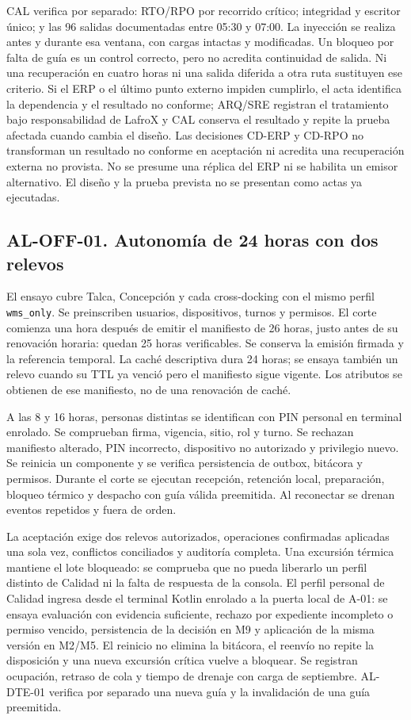 CAL verifica por separado: RTO/RPO por recorrido crítico; integridad y escritor único; y las 96 salidas documentadas entre 05:30 y 07:00. La inyección se realiza antes y durante esa ventana, con cargas intactas y modificadas. Un bloqueo por falta de guía es un control correcto, pero no acredita continuidad de salida. Ni una recuperación en cuatro horas ni una salida diferida a otra ruta sustituyen ese criterio. Si el ERP o el último punto externo impiden cumplirlo, el acta identifica la dependencia y el resultado no conforme; ARQ/SRE registran el tratamiento bajo responsabilidad de LafroX y CAL conserva el resultado y repite la prueba afectada cuando cambia el diseño. Las decisiones CD-ERP y CD-RPO no transforman un resultado no conforme en aceptación ni acredita una recuperación externa no provista. No se presume una réplica del ERP ni se habilita un emisor alternativo. El diseño y la prueba prevista no se presentan como actas ya ejecutadas.

\subsection*{AL-OFF-01. Autonomía de 24 horas con dos relevos}
El ensayo cubre Talca, Concepción y cada cross-docking con el mismo perfil \texttt{wms\_only}. Se preinscriben usuarios, dispositivos, turnos y permisos. El corte comienza una hora después de emitir el manifiesto de 26 horas, justo antes de su renovación horaria: quedan 25 horas verificables. Se conserva la emisión firmada y la referencia temporal. La caché descriptiva dura 24 horas; se ensaya también un relevo cuando su TTL ya venció pero el manifiesto sigue vigente. Los atributos se obtienen de ese manifiesto, no de una renovación de caché.

A las 8 y 16 horas, personas distintas se identifican con PIN personal en terminal enrolado. Se comprueban firma, vigencia, sitio, rol y turno. Se rechazan manifiesto alterado, PIN incorrecto, dispositivo no autorizado y privilegio nuevo. Se reinicia un componente y se verifica persistencia de outbox, bitácora y permisos. Durante el corte se ejecutan recepción, retención local, preparación, bloqueo térmico y despacho con guía válida preemitida. Al reconectar se drenan eventos repetidos y fuera de orden.

La aceptación exige dos relevos autorizados, operaciones confirmadas aplicadas una sola vez, conflictos conciliados y auditoría completa. Una excursión térmica mantiene el lote bloqueado: se comprueba que no pueda liberarlo un perfil distinto de Calidad ni la falta de respuesta de la consola. El perfil personal de Calidad ingresa desde el terminal Kotlin enrolado a la puerta local de A-01: se ensaya evaluación con evidencia suficiente, rechazo por expediente incompleto o permiso vencido, persistencia de la decisión en M9 y aplicación de la misma versión en M2/M5. El reinicio no elimina la bitácora, el reenvío no repite la disposición y una nueva excursión crítica vuelve a bloquear. Se registran ocupación, retraso de cola y tiempo de drenaje con carga de septiembre. AL-DTE-01 verifica por separado una nueva guía y la invalidación de una guía preemitida.

